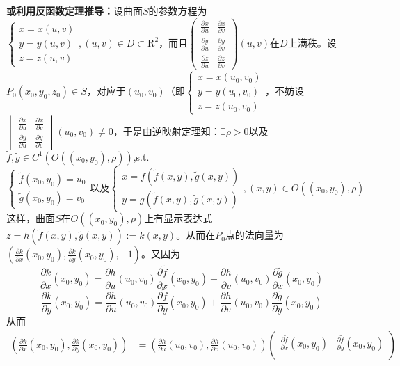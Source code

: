 \documentclass[UTF8]{ctexart}
\newcommand{\p}[2]{\frac{\partial #1}{\partial #2}}
\begin{document}
\begin{enumerate}[(1)]
        \textbf{或利用反函数定理推导：}设曲面$S$的参数方程为$\begin{cases}
            x=x(u,v)\\
            y=y(u,v)\\
            z=z(u,v)
        \end{cases},(u,v)\in D\subset\mathrm{R}^2$，而且$\begin{pmatrix}
            \p{x}{u}&\p{x}{v}\\
            \p{y}{u}&\p{y}{v}\\
            \p{z}{u}&\p{z}{v}
        \end{pmatrix}(u,v)$在$D$上满秩。设$P_0(x_0,y_0,z_0)\in S$，对应于$(u_0,v_0)$（即$\begin{cases}
            x=x(u_0,v_0)\\
            y=y(u_0,v_0)\\
            z=z(u_0,v_0)
        \end{cases}$，不妨设$\begin{vmatrix}
            \p{x}{u}&\p{x}{v}\\
            \p{y}{u}&\p{y}{v}
        \end{vmatrix}(u_0,v_0)\not=0$，于是由逆映射定理知：$\exists\rho>0$以及$\tilde{f},\tilde{g}\in C^1(O((x_0,y_0),\rho))$,s.t.
        $$\begin{cases}
            \tilde{f}(x_0,y_0)=u_0\\
            \tilde{g}(x_0,y_0)=v_0
        \end{cases}\text{以及}\begin{cases}
            x=f(\tilde{f}(x,y),\tilde{g}(x,y))\\
            y=g(\tilde{f}(x,y),\tilde{g}(x,y))
        \end{cases},(x,y)\in O((x_0,y_0),\rho)$$
        这样，曲面$S$在$O((x_0,y_0),\rho)$上有显示表达式$z=h(\tilde{f}(x,y),\tilde{g}(x,y)):=k(x,y)$。从而在$P_0$点的法向量为$\left(\p{k}{x}(x_0,y_0),\p{k}{y}(x_0,y_0),-1\right)$。又因为
        $$\p{k}{x}(x_0,y_0)=\p{h}{u}(u_0,v_0)\p{\tilde{f}}{x}(x_0,y_0)+\p{h}{v}(u_0,v_0)\p{\tilde{g}}{x}(x_0,y_0)$$
        $$\p{k}{y}(x_0,y_0)=\p{h}{u}(u_0,v_0)\p{\tilde{f}}{y}(x_0,y_0)+\p{h}{v}(u_0,v_0)\p{\tilde{g}}{y}(x_0,y_0)$$
        从而
        \begin{align*}
            \left(\p{k}{x}(x_0,y_0),\p{k}{y}(x_0,y_0)\right)&=\left(\p{h}{u}(u_0,v_0),\p{h}{v}(u_0,v_0)\right)\begin{pmatrix}
                \p{\tilde{f}}{x}(x_0,y_0)&\p{\tilde{f}}{y}(x_0,y_0)\\

\end{pmatrix}
\end{align*}
\end{enumerate}
\end{document}
